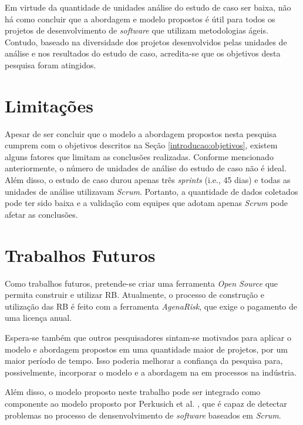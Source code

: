 Em virtude da quantidade de unidades análise do estudo de caso ser baixa, não há como concluir que a abordagem e modelo propostos é útil para todos os projetos de desenvolvimento de \textit{software} que utilizam metodologias ágeis. Contudo, baseado na diversidade dos projetos desenvolvidos pelas unidades de análise e nos resultados do estudo de caso, acredita-se que os objetivos desta pesquisa foram atingidos.

\section{Limitações}
\label{conclusao:limitacoes}

Apesar de ser concluir que o modelo a abordagem propostos nesta pesquisa cumprem com o objetivos descritos na Seção \ref{introducao:objetivos}, existem alguns fatores que limitam as conclusões realizadas. Conforme mencionado anteriormente, o número de unidades de análise do estudo de caso não é ideal. Além disso, o estudo de caso durou apenas três \textit{sprints} (i.e., 45 dias) e todas as unidades de análise utilizavam \textit{Scrum}. Portanto, a quantidade de dados coletados pode ter sido baixa e a validação com equipes que adotam apenas \textit{Scrum} pode afetar as conclusões.

\section{Trabalhos Futuros}
\label{conclusao:trabalhos}

Como trabalhos futuros, pretende-se criar uma ferramenta \textit{Open Source} que permita construir e utilizar RB. Atualmente, o processo de construção e utilização das RB é feito com a ferramenta \textit{AgenaRisk}, que exige o pagamento de uma licença anual.

Espera-se também que outros pesquisadores sintam-se motivados para aplicar o modelo e abordagem propostos em uma quantidade maior de projetos, por um maior período de tempo. Isso poderia melhorar a confiança da pesquisa para, possivelmente, incorporar o modelo e a abordagem na em processos na indústria.

Além disso, o modelo proposto neste trabalho pode ser integrado como componente ao modelo proposto por Perkusich et al. \cite{perkusich2013} \cite{perkusich2014}, que é capaz de detectar problemas no processo de densenvolvimento de \textit{software} baseados em \textit{Scrum}.
